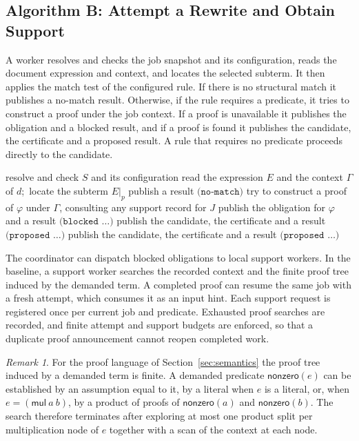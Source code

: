 \documentclass[11pt,a4paper]{article}
\theoremstyle{plain}
\theoremstyle{definition}
\theoremstyle{remark}
\newtheorem{remark}[theorem]{Remark}
\theoremstyle{definition}
\newcommand{\nz}{\mathsf{nonzero}}
\newcommand{\code}[1]{\texttt{#1}}
\begin{document}
\subsection{Algorithm B: Attempt a Rewrite and Obtain Support}

A worker resolves and checks the job snapshot and its configuration, reads the document expression and context, and locates the selected subterm. It then applies the match test of the configured rule. If there is no structural match it publishes a no-match result. Otherwise, if the rule requires a predicate, it tries to construct a proof under the job context. If a proof is unavailable it publishes the obligation and a blocked result, and if a proof is found it publishes the candidate, the certificate and a proposed result. A rule that requires no predicate proceeds directly to the candidate.

\begin{algorithm}
\caption{Attempt a rewrite.}
\label{alg:attempt}
\begin{algorithmic}[1]
  \State resolve and check $S$ and its configuration
  \State read the expression $E$ and the context $\Gamma$ of $d$;\ locate the subterm $E|_p$
    \State publish a result $\code{(no-match)}$
    \State try to construct a proof of $\varphi$ under $\Gamma$, consulting any support record for $J$
      \State publish the obligation for $\varphi$ and a result $\code{(blocked }\ldots\code{)}$
    \Else
      \State publish the candidate, the certificate and a result $\code{(proposed }\ldots\code{)}$
    \EndIf
  \Else
    \State publish the candidate, the certificate and a result $\code{(proposed }\ldots\code{)}$
  \EndIf
\EndProcedure
\end{algorithmic}
\end{algorithm}

The coordinator can dispatch blocked obligations to local support workers. In the baseline, a support worker searches the recorded context and the finite proof tree induced by the demanded term. A completed proof can resume the same job with a fresh attempt, which consumes it as an input hint. Each support request is registered once per current job and predicate. Exhausted proof searches are recorded, and finite attempt and support budgets are enforced, so that a duplicate proof announcement cannot reopen completed work.

\begin{remark}
For the proof language of Section~\ref{sec:semantics} the proof tree induced by a demanded term is finite. A demanded predicate $\nz(e)$ can be established by an assumption equal to it, by a literal when $e$ is a literal, or, when $e = (\mathsf{mul}\ a\ b)$, by a product of proofs of $\nz(a)$ and $\nz(b)$. The search therefore terminates after exploring at most one product split per multiplication node of $e$ together with a scan of the context at each node.
\end{remark}
\end{document}
